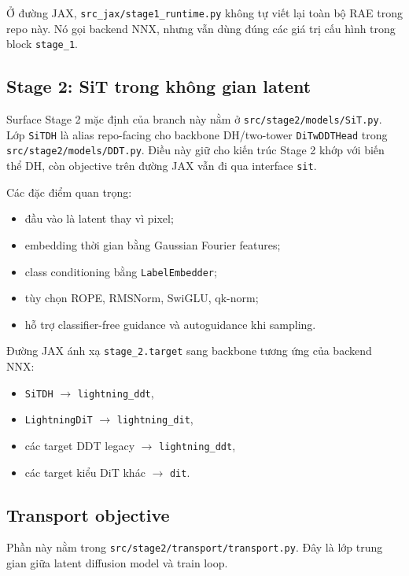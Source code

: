 Ở đường JAX, \texttt{src\_jax/stage1\_runtime.py} không tự viết lại toàn bộ RAE
trong repo này. Nó gọi backend NNX, nhưng vẫn dùng đúng các giá trị cấu hình
trong block \texttt{stage\_1}.

\subsection{Stage 2: SiT trong không gian latent}

Surface Stage 2 mặc định của branch này nằm ở \texttt{src/stage2/models/SiT.py}.
Lớp \texttt{SiTDH} là alias repo-facing cho backbone DH/two-tower
\texttt{DiTwDDTHead} trong \texttt{src/stage2/models/DDT.py}. Điều này giữ cho
kiến trúc Stage 2 khớp với biến thể DH, còn objective trên đường JAX vẫn đi qua
interface \texttt{sit}.

Các đặc điểm quan trọng:

\begin{itemize}[leftmargin=1.5em]
  \item đầu vào là latent thay vì pixel;
  \item embedding thời gian bằng Gaussian Fourier features;
  \item class conditioning bằng \texttt{LabelEmbedder};
  \item tùy chọn ROPE, RMSNorm, SwiGLU, qk-norm;
  \item hỗ trợ classifier-free guidance và autoguidance khi sampling.
\end{itemize}

Đường JAX ánh xạ \texttt{stage\_2.target} sang backbone tương ứng của backend
NNX:

\begin{itemize}[leftmargin=1.5em]
  \item \texttt{SiTDH} $\rightarrow$ \texttt{lightning\_ddt},
  \item \texttt{LightningDiT} $\rightarrow$ \texttt{lightning\_dit},
  \item các target DDT legacy $\rightarrow$ \texttt{lightning\_ddt},
  \item các target kiểu DiT khác $\rightarrow$ \texttt{dit}.
\end{itemize}

\subsection{Transport objective}

Phần này nằm trong \texttt{src/stage2/transport/transport.py}. Đây là lớp trung
gian giữa latent diffusion model và train loop.

